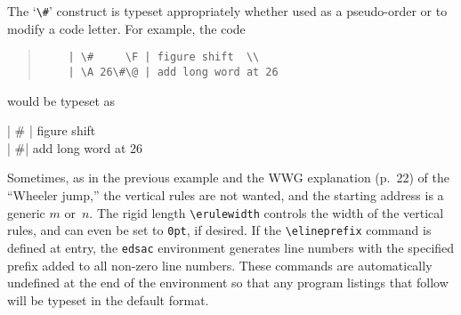 \documentclass[11pt]{article}
\newcommand{\hang}{\leftskip=1em\parindent=-1em}
\begin{document}
The `\verb"\#"' construct is typeset appropriately whether used as a
pseudo-order or to modify a code letter.  For example, the code
\begin{quote}\small
\begin{verbatim}
    | \#     \F | figure shift  \\
    | \A 26\#\@ | add long word at 26
\end{verbatim}
\end{quote}
would be typeset as
\bgroup\setlength{\erulewidth}{0pt}
\begin{edsac}{0}
\nonum  | \#     \F | figure shift  \\
\nonum  | \#\@ | add long word at 26
\end{edsac}
\egroup

Sometimes, as in the previous example and
the WWG explanation (p.~22) of the ``Wheeler jump,'' the
vertical rules are not wanted, and the starting address is a generic
$m$ or~$n$.
The rigid length \verb"\erulewidth" controls the width of the vertical
rules, and can even be set to \verb"0pt", if desired.
If the \verb"\elineprefix" command is defined at entry, the
\texttt{edsac} environment generates line numbers with the specified
prefix added to all non-zero line numbers.  These commands are
automatically undefined at the end of the environment so that
any program listings that follow will be typeset in the default format.
\bgroup\setlength{\erulewidth}{0pt}
\newcommand{\startloc}{m}
\newcommand{\elineprefix}{\ensuremath{\startloc}}
\egroup
\end{document}

